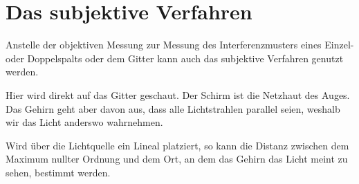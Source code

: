 \documentclass{article}
\begin{document}
\section{Das subjektive Verfahren}
Anstelle der objektiven Messung zur Messung des Interferenzmusters eines Einzel- oder Doppelspalts oder dem Gitter kann auch das subjektive Verfahren genutzt werden.
 
Hier wird direkt auf das Gitter geschaut. Der Schirm ist die Netzhaut des Auges. Das Gehirn geht aber davon aus, dass alle Lichtstrahlen parallel seien, weshalb wir das Licht anderswo wahrnehmen.
\begin{center} 
\end{center}
Wird über die Lichtquelle ein Lineal platziert, so kann die Distanz zwischen dem Maximum nullter Ordnung und dem Ort, an dem das Gehirn das Licht meint zu sehen, bestimmt werden.
\end{document}
